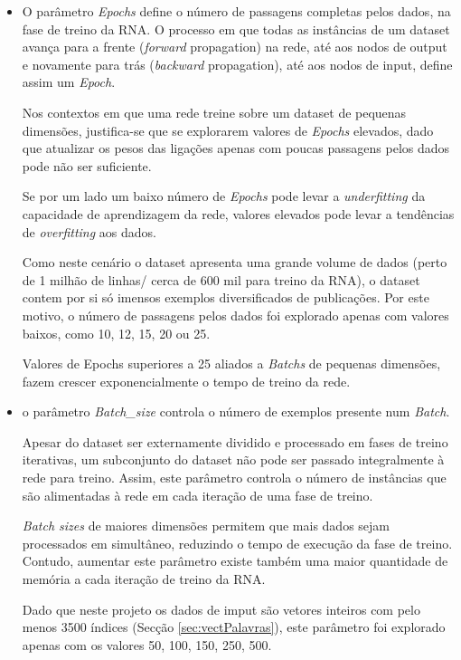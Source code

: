 \begin{itemize}
    \item O parâmetro \textit{Epochs} define o número de passagens completas pelos dados, na fase de treino da RNA. 
    O processo em que todas as instâncias de um dataset avança para a frente (\textit{forward} propagation) na rede, até aos nodos de output e novamente para trás (\textit{backward} propagation), até aos nodos de input, define assim um \textit{Epoch}. 
    
    Nos contextos em que uma rede treine sobre um dataset de pequenas dimensões, justifica-se que se explorarem valores de \textit{Epochs} elevados, dado que atualizar os pesos das ligações apenas com poucas passagens pelos dados pode não ser suficiente. 
    
    Se por um lado um baixo número de \textit{Epochs} pode levar a \textit{underfitting} da capacidade de aprendizagem da rede, valores elevados pode levar a tendências de \textit{overfitting} aos dados. 
    
    Como neste cenário o dataset apresenta uma grande volume de dados (perto de 1 milhão de linhas/ cerca de 600 mil para treino da RNA), o dataset contem por si só imensos exemplos diversificados de publicações. 
    Por este motivo, o número de passagens pelos dados foi explorado apenas com valores baixos, como 10, 12, 15, 20 ou 25.  
    
    Valores de Epochs superiores a 25 aliados a \textit{Batchs} de pequenas dimensões, fazem crescer exponencialmente o tempo de treino da rede. 
    
    \item o parâmetro \textit{Batch\_size} controla o número de exemplos presente num \textit{Batch}. 
    
    Apesar do dataset ser externamente dividido e processado em fases de treino iterativas, um subconjunto do dataset não pode ser passado integralmente à rede para treino. Assim, este parâmetro controla o número de instâncias que são alimentadas à rede em cada iteração de uma fase de treino.
    
    \textit{Batch sizes} de maiores dimensões permitem que mais dados sejam processados em simultâneo, reduzindo o tempo de execução da fase de treino. 
    Contudo, aumentar este parâmetro existe também uma maior quantidade de memória a cada iteração de treino da RNA. 
    
    Dado que neste projeto os dados de imput são vetores inteiros com pelo menos 3500 índices (Secção \ref{sec:vectPalavras}), este parâmetro foi explorado apenas com os valores {50, 100, 150, 250, 500}.
    

\end{itemize}
